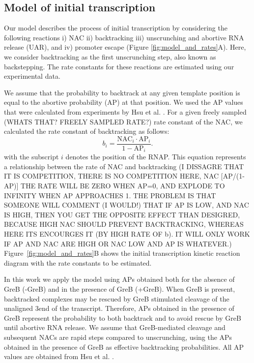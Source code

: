 %
\subsection{Model of initial transcription}
Our model describes the process of initial transcription by considering the
following  reactions  i) NAC ii) backtracking iii) unscrunching and abortive
RNA release (UAR), and iv) promoter escape (Figure
\ref{fig:model_and_rates}A). Here, we consider backtracking  as the first
unscrunching step, also known as backstepping. The rate constants for these
reactions are estimated using our experimental data.

We assume that the probability to backtrack at any given template position is
equal to the abortive probability (AP) at that position. We used the AP values
that were calculated from experiments by Hsu et al. \cite{hsu_initial_2006}.
For a given freely sampled (WHATS THAT? FREELY SAMPLED RATE?) rate constant of
the NAC, we calculated the rate constant of backtracking as follows:
\begin{equation}
  b_i = \frac{\text{NAC}_i\cdot\text{AP}_i}{1-\text{AP}_i}.
  \label{eq:backtrackingcalc}
\end{equation}
with the subscript $i$ denotes the position of the RNAP. This equation
represents a relationship between the rate of NAC and backtracking (I DISSAGRE
    THAT IT IS COMPETITION, THERE IS NO COMPETITION HERE, NAC [AP/(1-AP)] THE
    RATE WILL BE ZERO WHEN AP=0, AND EXPLODE TO INFINITY WHEN AP APPROACHES 1.
    THE PROBLEM IS THAT SOMEONE WILL COMMENT (I WOULD!) THAT IF AP IS LOW, AND
    NAC IS HIGH, THEN YOU GET THE OPPOSITE EFFECT THAN DESIGRED, BECAUSE HIGH
    NAC SHOULD PREVENT BACKTRACKING, WHEREAS HERE ITS ENCOURGES IT (BY HIGH
    RATE OF b). IT WILL ONLY WORK IF AP AND NAC ARE HIGH OR NAC LOW AND AP IS
WHATEVER.) Figure~\ref{fig:model_and_rates}B shows the initial transcription
kinetic reaction diagram with the rate constants to be estimated. 

In this work we apply the model using APs obtained both for the absence of
GreB (-GreB) and in the presence of GreB (+GreB). When GreB is present,
backtracked complexes may be rescued by GreB stimulated cleavage of the
unaligned 3\ppp end of the transcript. Therefore, APs obtained in the presence
of GreB represent the probability to both backtrack and to avoid rescue by
GreB until abortive RNA release. We assume that GreB-mediated cleavage and
subsequent NACs are rapid steps compared to unscrunching, using the APs
obtained in the presence of GreB as effective backtracking probabilities. All
AP values are obtained from Hsu et al. \cite{hsu_initial_2006}.

